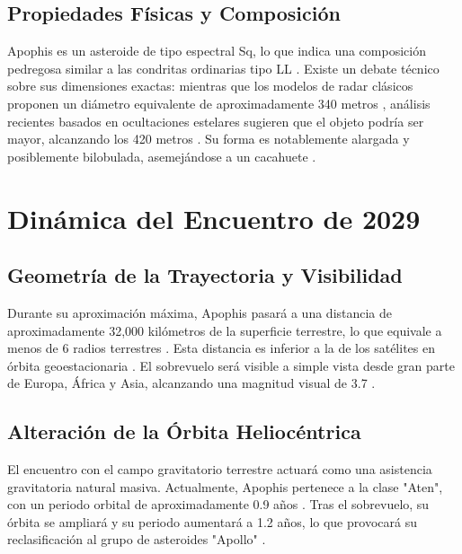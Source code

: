 \documentclass[a4paper]{article}
\begin{document}
\subsection{Propiedades Físicas y Composición}
Apophis es un asteroide de tipo espectral Sq, lo que indica una composición pedregosa similar a las condritas ordinarias tipo LL \cite{kim2023tidal, jpl2024sbdb}. Existe un debate técnico sobre sus dimensiones exactas: mientras que los modelos de radar clásicos proponen un diámetro equivalente de aproximadamente 340 metros \cite{vallejo2022conditions, jpl2024sbdb}, análisis recientes basados en ocultaciones estelares sugieren que el objeto podría ser mayor, alcanzando los 420 metros \cite{broz2026apophis}. Su forma es notablemente alargada y posiblemente bilobulada, asemejándose a un cacahuete \cite{nasa2025apophisfacts, scheeres2023proximity}.

\section{Dinámica del Encuentro de 2029}

\subsection{Geometría de la Trayectoria y Visibilidad}
Durante su aproximación máxima, Apophis pasará a una distancia de aproximadamente 32,000 kilómetros de la superficie terrestre, lo que equivale a menos de 6 radios terrestres \cite{vallejo2022conditions, esa2024apophis}. Esta distancia es inferior a la de los satélites en órbita geoestacionaria \cite{nasa2025apophisfacts, scheeres2023proximity}. El sobrevuelo será visible a simple vista desde gran parte de Europa, África y Asia, alcanzando una magnitud visual de 3.7 \cite{broz2026apophis, vallejo2022conditions, esa2024ramses}.

\subsection{Alteración de la Órbita Heliocéntrica}
El encuentro con el campo gravitatorio terrestre actuará como una asistencia gravitatoria natural masiva. Actualmente, Apophis pertenece a la clase "Aten", con un periodo orbital de aproximadamente 0.9 años \cite{nasa2025apophisfacts, jpl2024sbdb}. Tras el sobrevuelo, su órbita se ampliará y su periodo aumentará a 1.2 años, lo que provocará su reclasificación al grupo de asteroides "Apollo" \cite{esa2024apophis, jpl2024sbdb}.
\end{document}
